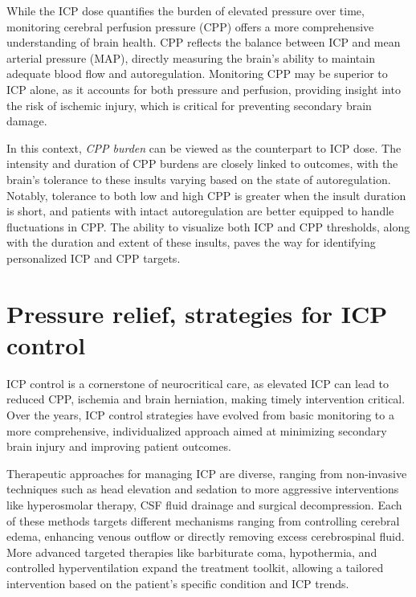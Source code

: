 While the ICP dose quantifies the burden of elevated pressure over time, monitoring cerebral perfusion pressure (CPP) offers a more comprehensive understanding of brain health. CPP reflects the balance between ICP and mean arterial pressure (MAP), directly measuring the brain’s ability to maintain adequate blood flow and autoregulation. Monitoring CPP may be superior to ICP alone, as it accounts for both pressure and perfusion, providing insight into the risk of ischemic injury, which is critical for preventing secondary brain damage. 

In this context, \textit {CPP burden}\cite{zoerleAccuracyManualIntracranial2023a} can be viewed as the counterpart to ICP dose. The intensity and duration of CPP burdens are closely linked to outcomes, with the brain’s tolerance to these insults varying based on the state of autoregulation. Notably, tolerance to both low and high CPP is greater when the insult duration is short, and patients with intact autoregulation are better equipped to handle fluctuations in CPP\cite{guizaCerebralPerfusionPressure2017}. The ability to visualize both ICP and CPP thresholds, along with the duration and extent of these insults, paves the way for identifying personalized ICP and CPP targets.\\

  \section[Pressure relief, strategies for ICP control]{Pressure relief, strategies for ICP control}
ICP control is a cornerstone of neurocritical care, as elevated ICP can lead to reduced CPP, ischemia and brain herniation, making timely intervention critical. Over the years, ICP control strategies have evolved from basic monitoring to a more comprehensive, individualized approach aimed at minimizing secondary brain injury and improving patient outcomes.

Therapeutic approaches for managing ICP are diverse, ranging from non-invasive techniques such as head elevation and sedation to more aggressive interventions like hyperosmolar therapy, CSF fluid drainage and surgical decompression. Each of these methods targets different mechanisms ranging from controlling cerebral edema, enhancing venous outflow or directly removing excess cerebrospinal fluid. More advanced targeted therapies like barbiturate coma, hypothermia, and controlled hyperventilation expand the treatment toolkit, allowing a tailored intervention based on the patient’s specific condition and ICP trends.\\

